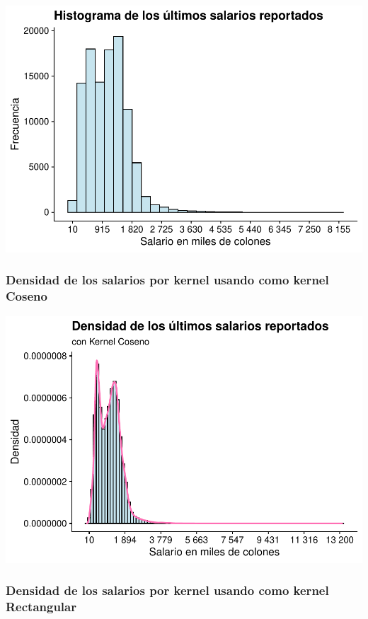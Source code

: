 \documentclass[
]{article}
\begin{document}
\includegraphics{Tarea1_files/figure-latex/unnamed-chunk-12-1.pdf}

\hypertarget{densidad-de-los-salarios-por-kernel-usando-como-kernel-coseno}{%
\subsubsection{Densidad de los salarios por kernel usando como kernel
Coseno}\label{densidad-de-los-salarios-por-kernel-usando-como-kernel-coseno}}

\includegraphics{Tarea1_files/figure-latex/unnamed-chunk-13-1.pdf}

\hypertarget{densidad-de-los-salarios-por-kernel-usando-como-kernel-rectangular}{%
\subsubsection{Densidad de los salarios por kernel usando como kernel
Rectangular}\label{densidad-de-los-salarios-por-kernel-usando-como-kernel-rectangular}}
\end{document}
